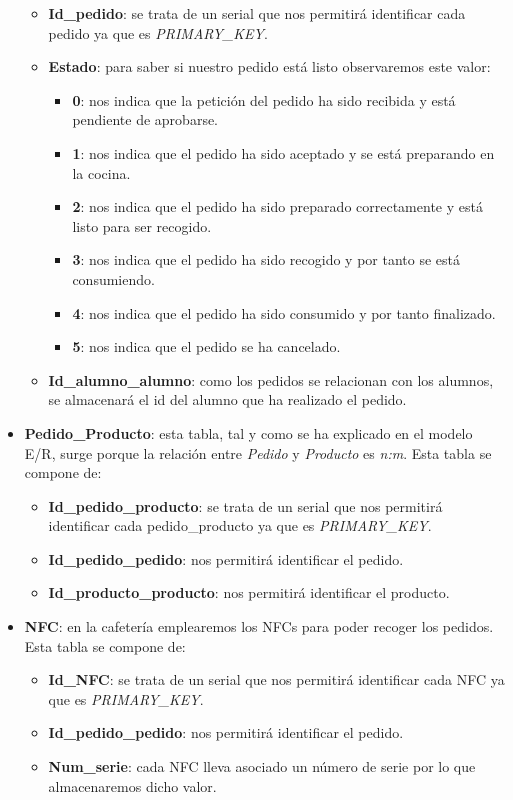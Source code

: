 \documentclass[12pt]{report}
\begin{document}
\begin{itemize}
    \begin{itemize}
        \item\textbf{Id\_pedido}: se trata de un serial que nos permitirá identificar cada pedido ya que es \textit{PRIMARY\_KEY}.
        \item \textbf{Estado}: para saber si nuestro pedido está listo observaremos este valor:
        \begin{itemize}
            \item \textbf{0}: nos indica que la petición del pedido ha sido recibida y está pendiente de aprobarse.
            \item \textbf{1}: nos indica que el pedido ha sido aceptado y se está preparando en la cocina.
            \item \textbf{2}: nos indica que el pedido ha sido preparado correctamente y está listo para ser recogido.
            \item \textbf{3}: nos indica que el pedido ha sido recogido y por tanto se está consumiendo.
            \item \textbf{4}: nos indica que el pedido ha sido consumido y por tanto finalizado.
            \item \textbf{5}: nos indica que el pedido se ha cancelado.
        \end{itemize}
        \item \textbf{Id\_alumno\_alumno}: como los pedidos se relacionan con los alumnos, se almacenará el id del alumno que ha realizado el pedido. 
    \\
    \end{itemize} 
    \item  \textbf{Pedido\_Producto}: esta tabla, tal y como se ha explicado en el modelo E/R, surge porque la relación entre \textit{Pedido} y \textit{Producto} es \textit{n:m}. Esta tabla se compone de:
    \begin{itemize}
        \item\textbf{Id\_pedido\_producto}: se trata de un serial que nos permitirá identificar cada pedido\_producto ya que es \textit{PRIMARY\_KEY}.
        \item\textbf{Id\_pedido\_pedido}: nos permitirá identificar el pedido.
        \item\textbf{Id\_producto\_producto}: nos permitirá identificar el producto.
        \\
    \end{itemize} 
    \item  \textbf{NFC}: en la cafetería emplearemos los NFCs para poder recoger los pedidos. Esta tabla se compone de:
    \begin{itemize}
        \item\textbf{Id\_NFC}: se trata de un serial que nos permitirá identificar cada NFC ya que es \textit{PRIMARY\_KEY}.
        \item\textbf{Id\_pedido\_pedido}: nos permitirá identificar el pedido.
        \item\textbf{Num\_serie}: cada NFC lleva asociado un número de serie por lo que almacenaremos dicho valor.
    \\
    \end{itemize} 
\end{itemize} 
\end{document}
